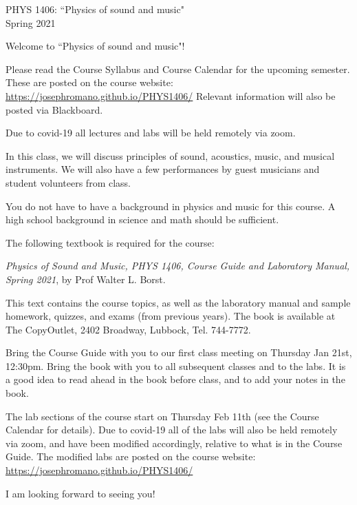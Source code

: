 \documentclass[11pt]{NSF}
\begin{document}
\begin{center}
PHYS 1406: ``Physics of sound and music"\\
Spring 2021
\end{center}

Welcome to ``Physics of sound and music"!

Please read the Course Syllabus and Course Calendar for the upcoming semester. 
These are posted on the course website:
\url{https://josephromano.github.io/PHYS1406/}
Relevant information will also be posted via Blackboard.

Due to covid-19 all lectures and labs will be held remotely via zoom.

In this class, we will discuss principles of sound, acoustics, music,
and musical instruments.  We will also have a few performances by
guest musicians %
and student volunteers from class. 

You do not have to have a background in physics and music for this
course. A high school background in science and math should be
sufficient.

The following textbook is required for the course:

{\em Physics of Sound and Music, PHYS 1406,
Course Guide and Laboratory Manual, Spring 2021}, by Prof Walter L. Borst.

This text contains the course topics, as well as the laboratory manual 
and sample homework, quizzes, and exams (from previous years).
The book is available at
The CopyOutlet, 2402 Broadway, Lubbock, Tel. 744-7772.

Bring the Course Guide with you to our first class meeting on Thursday
Jan 21st, 12:30pm. 
Bring the book with you to all subsequent classes and to the labs.  
It is a good idea to read ahead in the book before
class, and to add your notes in the book.


The lab sections of the course start on Thursday Feb 11th
(see the Course Calendar for details).
Due to covid-19 all of the labs will also be held remotely via zoom,
and have been modified accordingly, relative to what is in the Course Guide.
The modified labs are posted on the course website:
\url{https://josephromano.github.io/PHYS1406/}


I am looking forward to seeing you!
\end{document}
